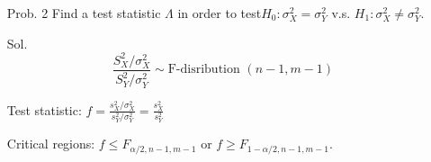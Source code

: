 \begin{frame}
	\begin{enumerate}
		\item[Prob. 2] Find a test statistic $\Lambda$ in order to test\qquad $H_0 : \sigma_X^2 = \sigma_Y^2$ v.s. $H_1 : \sigma_X^2 \ne \sigma^2_Y$. \\[2em]
		\vfill
		\item[Sol.]
			\[
			\frac{S_X^2/\sigma_X^2}{S_Y^2/\sigma_Y^2} \sim \text{F-disribution $(n-1,m-1)$}
			\]
			\vfill
		\item[] Test statistic: $f =\frac{s_X^2/\sigma_X^2}{s_Y^2/\sigma_Y^2}=\frac{s_X^2}{s_Y^2} $
			\vfill
		\item[] Critical regions: $f\le  F_{\alpha/2,n-1,m-1}$ or $f\ge F_{1-\alpha/2,n-1,m-1}$. \myEnd
	\end{enumerate}
\end{frame}
